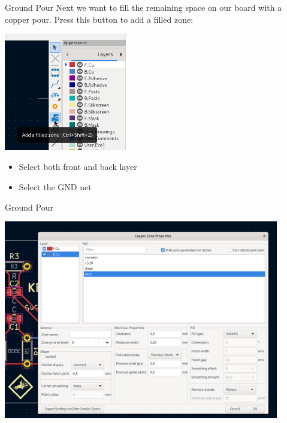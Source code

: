 \documentclass{beamer}
\begin{document}
\begin{frame}{Ground Pour}
  Next we want to fill the remaining space on our board with a copper pour. Press this button to add a filled zone:
  \begin{center}
    \includegraphics[width=0.4\textwidth]{images/add-filled-zone.png}
  \end{center}
  \begin{itemize}
    \item Select both front and back layer
    \item Select the GND net
  \end{itemize}
\end{frame}

\begin{frame}{Ground Pour}
  \begin{center}
    \includegraphics[width=0.9\textwidth]{images/fill-zone.png}
  \end{center}
\end{frame}
\end{document}
